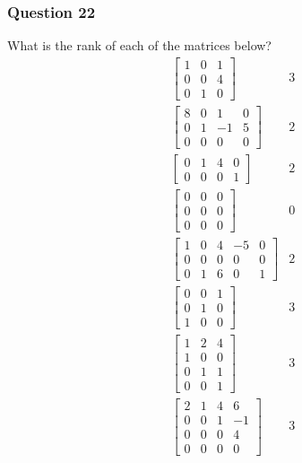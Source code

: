 \documentclass{math}
\begin{document}
\subsubsection*{Question 22}
What is the rank of each of the matrices below?
\begin{align*}
  \begin{bmatrix}
    1 & 0 & 1 \\
    0 & 0 & 4 \\
    0 & 1 & 0
  \end{bmatrix} & 3 \\
  \begin{bmatrix}
    8 & 0 & 1 & 0 \\
    0 & 1 & -1 & 5 \\
    0 & 0 & 0 & 0
  \end{bmatrix} & 2 \\
  \begin{bmatrix}
    0 & 1 & 4 & 0 \\
    0 & 0 & 0 & 1
  \end{bmatrix} & 2 \\
  \begin{bmatrix}
    0 & 0 & 0 \\
    0 & 0 & 0 \\
    0 & 0 & 0
  \end{bmatrix} & 0 \\
  \begin{bmatrix}
    1 & 0 & 4 & -5 & 0 \\
    0 & 0 & 0 & 0 & 0 \\
    0 & 1 & 6 & 0 & 1
  \end{bmatrix} & 2 \\
  \begin{bmatrix}
    0 & 0 & 1 \\
    0 & 1 & 0 \\
    1 & 0 & 0
  \end{bmatrix} & 3 \\
  \begin{bmatrix}
    1 & 2 & 4 \\
    1 & 0 & 0 \\
    0 & 1 & 1 \\
    0 & 0 & 1
  \end{bmatrix} & 3 \\
  \begin{bmatrix}
    2 & 1 & 4 & 6 \\
    0 & 0 & 1 & -1 \\
    0 & 0 & 0 & 4 \\
    0 & 0 & 0 & 0
  \end{bmatrix} & 3
\end{align*}
\end{document}
